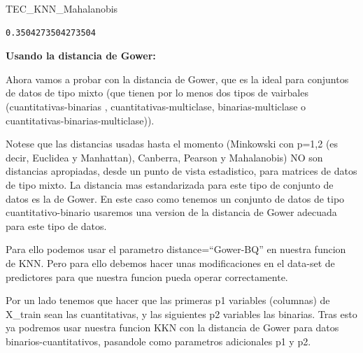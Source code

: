 \documentclass[
  11pt,
  a4paper,
]{article}
\newenvironment{Shaded}{\begin{snugshade}}{\end{snugshade}}
\newcommand{\NormalTok}[1]{#1}
\begin{document}
\begin{Shaded}
\begin{Highlighting}[]
\NormalTok{TEC\_KNN\_Mahalanobis}
\end{Highlighting}
\end{Shaded}

\begin{verbatim}
0.3504273504273504
\end{verbatim}

\vspace{0.35cm}

\textbf{Usando la distancia de Gower:}

Ahora vamos a probar con la distancia de Gower, que es la ideal para
conjuntos de datos de tipo mixto (que tienen por lo menos dos tipos de
vairbales (cuantitativas-binarias , cuantitativas-multiclase,
binarias-multiclase o cuantitativas-binarias-multiclase)).

Notese que las distancias usadas hasta el momento (Minkowski con p=1,2
(es decir, Euclidea y Manhattan), Canberra, Pearson y Mahalanobis) NO
son distancias apropiadas, desde un punto de vista estadistico, para
matrices de datos de tipo mixto. La distancia mas estandarizada para
este tipo de conjunto de datos es la de Gower. En este caso como tenemos
un conjunto de datos de tipo cuantitativo-binario usaremos una version
de la distancia de Gower adecuada para este tipo de datos.

Para ello podemos usar el parametro distance=``Gower-BQ'' en nuestra
funcion de KNN. Pero para ello debemos hacer unas modificaciones en el
data-set de predictores para que nuestra funcion pueda operar
correctamente.

Por un lado tenemos que hacer que las primeras p1 variables (columnas)
de X\_train sean las cuantitativas, y las siguientes p2 variables las
binarias. Tras esto ya podremos usar nuestra funcion KKN con la
distancia de Gower para datos binarios-cuantitativos, pasandole como
parametros adicionales p1 y p2.
\end{document}
